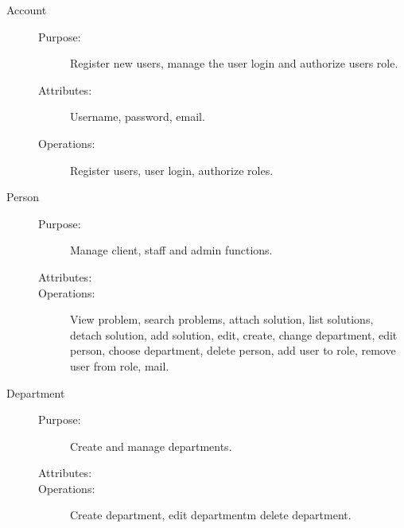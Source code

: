 \newpage
\begin{description}
\item[Account]\hfill
\begin{description}
\item[Purpose:]Register new users, manage the user login and authorize users role.
\item[Attributes:] Username, password, email.
\item[Operations:]Register users, user login, authorize roles.
\end{description}
\end{description}





\begin{description}
\item[Person]\hfill
\begin{description}
\item[Purpose:]Manage client, staff and admin functions.
\item[Attributes:]
\item[Operations:]View problem, search problems, attach solution, list solutions, detach solution, add solution, edit, create, change department, edit person, choose department, delete person, add user to role, remove user from role, mail.
\end{description}
\end{description}


 
 


\begin{description}
\item[Department]\hfill
\begin{description}
\item[Purpose:]Create and manage departments.
\item[Attributes:]
\item[Operations:]Create department, edit departmentm delete department.
\end{description}
\end{description}


